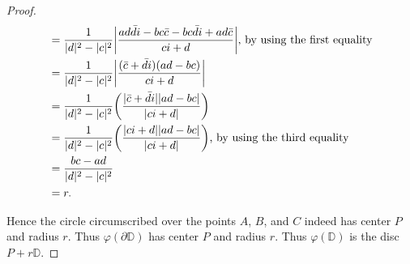 \begin{proof}
\begin{align*}
		&= \frac{1}{|d|^2 - |c|^2} \biggl\lvert\frac{ad\bar{d}i - bc\bar{c} - bc\bar{d}i + ad\bar{c}}{ci+d}\biggr\rvert \textrm{, by using the first equality}\\
		&= \frac{1}{|d|^2 - |c|^2} \biggl\lvert\frac{(\bar{c}+\bar{d}i)(ad-bc)}{ci+d}\biggr\rvert \\
		&= \frac{1}{|d|^2 - |c|^2} \biggl(\frac{|\bar{c}+\bar{d}i||ad-bc|}{|ci+d|}\biggr) \\
		&= \frac{1}{|d|^2 - |c|^2} \biggl(\frac{|ci+d||ad-bc|}{|ci+d|}\biggr) \textrm{, by using the third equality}\\
		&= \frac{bc - ad}{|d|^2 - |c|^2} \\
		&= r.
\end{align*}

Hence the circle circumscribed over the points $A$, $B$, and $C$ indeed has center $P$ and radius $r$.  Thus $\varphi(\mathbb{\partial\mathbb{D}})$ has center $P$ and radius $r$.  Thus $\varphi(\mathbb{D})$ is the disc $P+r\mathbb{D}$.
\end{proof}